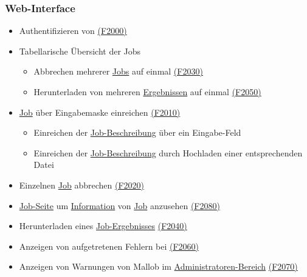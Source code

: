     \subsubsection{Web-Interface}
        \begin{itemize}[noitemsep]
            \item Authentifizieren von  \hyperref[FA:Web-Interface:Anmelden]{(F2000)}
            \item Tabellarische Übersicht  der Jobs
                \begin{itemize}[noitemsep]
                    \item Abbrechen mehrerer \hyperref[B:Jobs]{Jobs} auf einmal \hyperref[FA:Web-Interface:Abbruch mehrerer Jobs auf einmal]{(F2030)}
                    \item Herunterladen von mehreren \hyperref[B:Job-Ergebnis]{Ergebnissen} auf einmal \hyperref[FA:Web-Interface:herunterladen mehrerer Ergebnisse auf einmal]{(F2050)}
                \end{itemize}
            \item \hyperref[B:Jobs]{Job} über Eingabemaske einreichen \hyperref[FA:Web-Interface:Job einreichen]{(F2010)}
                \begin{itemize}[noitemsep]
                    \item Einreichen der \hyperref[B:Job-Beschreibung]{Job-Beschreibung} über ein Eingabe-Feld 
                    \item Einreichen der \hyperref[B:Job-Beschreibung]{Job-Beschreibung} durch Hochladen einer entsprechenden Datei
                \end{itemize}
            \item Einzelnen \hyperref[B:Jobs]{Job} abbrechen \hyperref[FA:Web-Interface:Abbruch eines einzelnen Jobs]{(F2020)}
            \item \hyperref[pages:job-page]{Job-Seite} um \hyperref[B:Job-Informationen]{Information} von \hyperref[B:Jobs]{Job} anzusehen \hyperref[FA:Web-Interface:Einsehen von Job-Informationen]{(F2080)}
            \item Herunterladen eines \hyperref[B:Job-Ergebnis]{Job-Ergebnisses} \hyperref[FA:Web-Interface:Herunterladen eines einzelnen Ergebnisses]{(F2040)}
            \item Anzeigen von aufgetretenen Fehlern bei  \hyperref[FA:Web-Interface:Anzeigen von Fehlern]{(F2060)}
            \item Anzeigen von Warnungen von \gls{Mallob} im \hyperref[pages:admin]{Administratoren-Bereich} \hyperref[FA:Web-Interface:Anzeigen von Warnungen und Fehlermeldungen]{(F2070)} 
            
                      
        \end{itemize}

